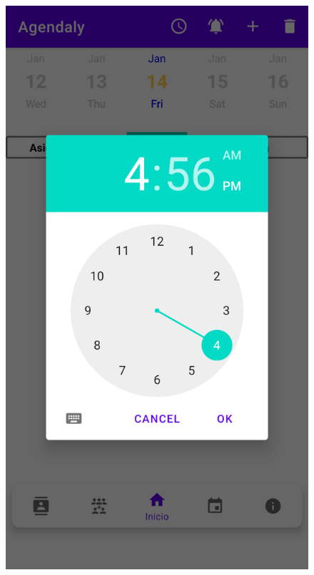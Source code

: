\documentclass[a4paper,openright,12pt]{article}
\begin{document}
\begin{figure}
        \includegraphics[scale=0.05]{notificacion3.png} 

\end{figure}
\end{document}
